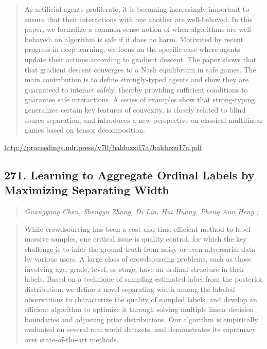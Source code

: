 \documentclass{article}
\begin{document}
\begin{quote}
    As artificial agents proliferate, it is becoming increasingly important to ensure that their interactions with one another are well-behaved. In this paper, we formalize a common-sense notion of when algorithms are well-behaved: an algorithm is safe if it does no harm. Motivated by recent progress in deep learning, we focus on the specific case where agents update their actions according to gradient descent. The paper shows that that gradient descent converges to a Nash equilibrium in safe games. The main contribution is to define strongly-typed agents and show they are guaranteed to interact safely, thereby providing sufficient conditions to guarantee safe interactions. A series of examples show that strong-typing generalizes certain key features of convexity, is closely related to blind source separation, and introduces a new perspective on classical multilinear games based on tensor decomposition.  
\end{quote}

\href{http://proceedings.mlr.press/v70/balduzzi17a/balduzzi17a.pdf}{http://proceedings.mlr.press/v70/balduzzi17a/balduzzi17a.pdf}

\subsection{271. Learning to Aggregate Ordinal Labels by Maximizing Separating Width}

\begin{quote}
\footnotesize{\textit{Guangyong Chen, Shengyu Zhang, Di Lin, Hui Huang, Pheng Ann Heng ;}}

\end{quote}

\begin{quote}
    While crowdsourcing has been a cost and time efficient method to label massive samples, one critical issue is quality control, for which the key challenge is to infer the ground truth from noisy or even adversarial data by various users. A large class of crowdsourcing problems, such as those involving age, grade, level, or stage, have an ordinal structure in their labels. Based on a technique of sampling estimated label from the posterior distribution, we define a novel separating width among the labeled observations to characterize the quality of sampled labels, and develop an efficient algorithm to optimize it through solving multiple linear decision boundaries and adjusting prior distributions. Our algorithm is empirically evaluated on several real world datasets, and demonstrates its supremacy over state-of-the-art methods.  
\end{quote}
\end{document}
